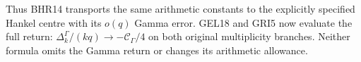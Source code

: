 Thus BHR14 transports the same arithmetic constants to
the explicitly specified Hankel centre with its $o(q)$
Gamma error. GEL18 and GRI5 now evaluate the full return:
$\Delta_k^\Gamma/(kq)\to-\mathcal C_\Gamma/4$ on both
original multiplicity branches. Neither formula omits
the Gamma return or changes its arithmetic allowance.